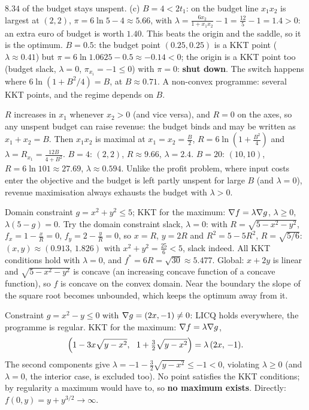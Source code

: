 \begin{solutions}
        $8.34$ of the budget stays unspent.
        (c) $B=4<2t_1$: on the budget line $x_1x_2$ is largest at $(2,2)$,
        $\pi=6\ln5-4\approx5.66$, with
        $\lambda=\tfrac{6x_2}{1+x_1x_2}-1=\tfrac{12}{5}-1=1.4>0$: an extra
        euro of budget is worth $1.40$. This beats the origin and the
        saddle, so it is the optimum. $B=0.5$: the budget point
        $(0.25,0.25)$ is a KKT point ($\lambda\approx0.41$) but
        $\pi=6\ln1.0625-0.5\approx-0.14<0$; the origin is a KKT point too
        (budget slack, $\lambda=0$, $\pi_{x_i}=-1\le0$) with $\pi=0$:
        \textbf{shut down}. The switch happens where
        $6\ln(1+B^{2}/4)=B$, at $B\approx0.71$. A non-convex programme: several
        KKT points, and the regime depends on $B$.
  \item $R$ increases in $x_1$ whenever $x_2>0$ (and vice versa), and
        $R=0$ on the axes, so any unspent budget can raise revenue: the
        budget binds and may be written as $x_1+x_2=B$. Then $x_1x_2$ is
        maximal at $x_1=x_2=\tfrac B2$, $R=6\ln(1+\tfrac{B^{2}}4)$ and
        $\lambda=R_{x_1}=\tfrac{12B}{4+B^{2}}$. $B=4$: $(2,2)$,
        $R\approx9.66$, $\lambda=2.4$. $B=20$: $(10,10)$, $R=6\ln101\approx27.69$,
        $\lambda\approx0.594$. Unlike the profit problem, where input costs
        enter the objective and the budget is left partly unspent for large
        $B$ (and $\lambda=0$), revenue maximisation always exhausts the
        budget with $\lambda>0$.
  \item Domain constraint $g=x^{2}+y^{2}\le5$; KKT for the maximum:
        $\nabla f=\lambda\nabla g$, $\lambda\ge0$, $\lambda(5-g)=0$. Try the
        domain constraint slack, $\lambda=0$: with $R=\sqrt{5-x^{2}-y^{2}}$,
        $f_x=1-\tfrac xR=0$, $f_y=2-\tfrac yR=0$, so $x=R$, $y=2R$ and
        $R^{2}=5-5R^{2}$, $R=\sqrt{5/6}$: $(x,y)\approx(0.913,\,1.826)$ with
        $x^{2}+y^{2}=\tfrac{25}6<5$, slack indeed. All KKT conditions hold
        with $\lambda=0$, and $f^*=6R=\sqrt{30}\approx5.477$. Global: $x+2y$
        is linear and $\sqrt{5-x^{2}-y^{2}}$ is concave (an increasing
        concave function of a concave function), so $f$ is concave on the
        convex domain. Near the boundary the slope of the square root becomes unbounded,
        which keeps the optimum away from it.
  \item Constraint $g=x^{2}-y\le0$ with $\nabla g=(2x,-1)\neq0$: LICQ holds
        everywhere, the programme is regular. KKT for the maximum:
        $\nabla f=\lambda\nabla g$,
        \[
          \Bigl(1-3x\sqrt{y-x^{2}},\ \ 1+\tfrac32\sqrt{y-x^{2}}\Bigr)
          =\lambda\,(2x,\,-1).
        \]
        The second components give $\lambda=-1-\tfrac32\sqrt{y-x^{2}}\le-1<0$,
        violating $\lambda\ge0$ (and $\lambda=0$, the interior case, is
        excluded too). No point satisfies the KKT conditions; by regularity
        a maximum would have to, so \textbf{no maximum exists}. Directly:
        $f(0,y)=y+y^{3/2}\to\infty$.
\end{solutions}
